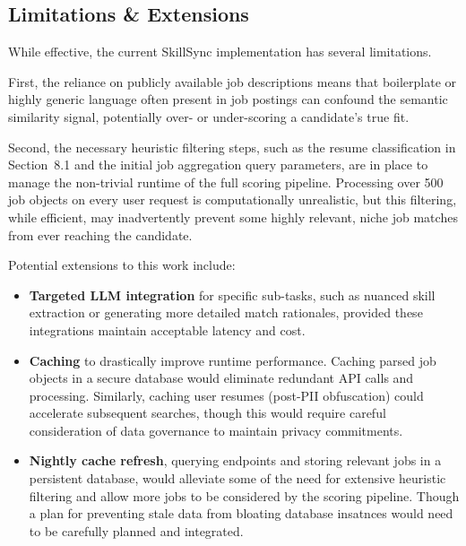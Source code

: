 \documentclass[12pt]{article}
\begin{document}
\subsection{Limitations \& Extensions}

While effective, the current SkillSync implementation has several limitations.

First, the reliance on publicly available job descriptions means that boilerplate or highly generic language often present in job postings can confound the semantic similarity signal, potentially over- or under-scoring a candidate's true fit.

Second, the necessary heuristic filtering steps, such as the resume classification in Section~8.1 and the initial job aggregation query parameters, are in place to manage the non-trivial runtime of the full scoring pipeline. Processing over 500 job objects on every user request is computationally unrealistic, but this filtering, while efficient, may inadvertently prevent some highly relevant, niche job matches from ever reaching the candidate.

Potential extensions to this work include:
\begin{itemize}
    \item \textbf{Targeted LLM integration} for specific sub-tasks, such as nuanced skill extraction or generating more detailed match rationales, provided these integrations maintain acceptable latency and cost.
    \item \textbf{Caching} to drastically improve runtime performance. Caching parsed job objects in a secure database would eliminate redundant API calls and processing. Similarly, caching user resumes (post-PII obfuscation) could accelerate subsequent searches, though this would require careful consideration of data governance to maintain privacy commitments.
    \item \textbf{Nightly cache refresh}, querying endpoints and storing relevant jobs in a persistent database, would alleviate some of the need for extensive heuristic filtering and allow more jobs to be considered by the scoring pipeline. Though a plan for preventing stale data from bloating database insatnces would need to be carefully planned and integrated.
\end{itemize}
\end{document}
